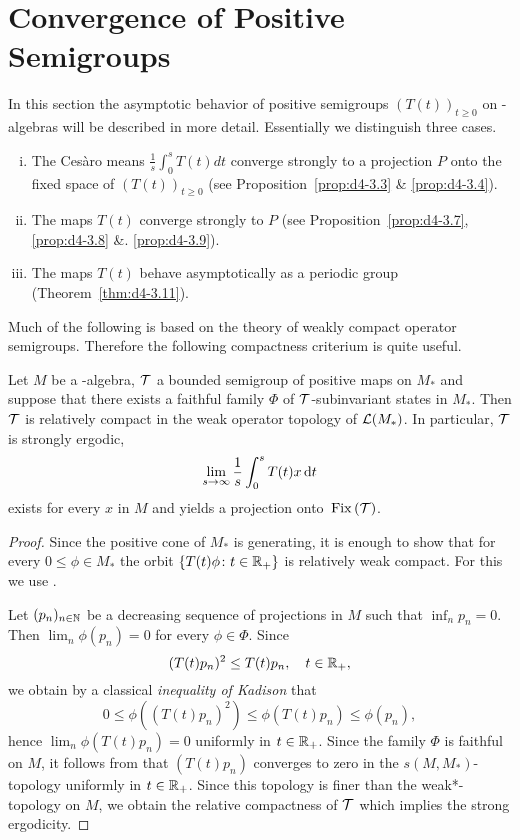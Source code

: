 \section{Convergence of Positive Semigroups}\label{sec:d4-3}
In this section the asymptotic behavior of positive semigroups $(T(t))_{t \geq 0}$ on \WA-algebras will be described in more detail.
Essentially we distinguish three cases.
\begin{enumerate}[(i)]
\item
The Cesàro means $\frac{1}{s}\int_{0}^{s} T(t)dt$ converge strongly to a projection $P$ onto the fixed space of $(T(t))_{t \geq 0}$ (see Proposition~\ref{prop:d4-3.3} \& \ref{prop:d4-3.4}).

\item
The maps $T(t)$ converge strongly to $P$ (see Proposition~\ref{prop:d4-3.7}, \ref{prop:d4-3.8} \&. \ref{prop:d4-3.9}).

\item
The maps $T(t)$ behave asymptotically as a periodic group (Theorem~\ref{thm:d4-3.11}).
\end{enumerate}
Much of the following is based on the theory of weakly compact operator semigroups.
Therefore the following compactness criterium is quite useful.
\begin{proposition}\label{prop:d4-3.1}
Let $M$ be a \WA-algebra, $\mathcal{T}$ a bounded semigroup of positive maps on $M_{*}$ and suppose that there exists a faithful family $\Phi$ of\/ $\mathcal{T}$-subinvariant states in $M_{*}$.
Then $\mathcal{T}$ is relatively compact in the weak operator topology of $ \mathcal{L}(M_{*}) $.
In particular, $\mathcal{T}$ is strongly ergodic, \ie 
%
\[
	\lim_{s \to \infty} \frac{1}{s}\int_{0}^{s} T(t)x \mathop{}\!\mathrm{d}{t}
\]
%
exists for every $x$ in $M$ and yields a projection onto $\mathop{}\mathrm{Fix}\left(\mathcal{T}\right)$.
\end{proposition}
%
\begin{proof}
Since the positive cone of $M_{*}$ is generating, it is enough to show that for every $0 \leq \phi \in M_{*}$ the orbit $\{T(t)\phi \colon t \in \mathbb{R}_{+}\}$ is relatively weak compact.
For this we use \citet[Theorem III.5.4.(iii)]{takesaki:1979}.

Let $(p_{n})_{n \in \mathbb{N}}$ be a decreasing sequence of projections in $M$ such that $\inf_{n} p_{n} = 0$.
Then $\lim_{n}\phi(p_{n}) = 0$ for every $\phi \in \Phi$.
Since
\[
	(T(t)p_{n})^2 \leq T(t)p_{n}, \quad t \in \mathbb{R}_{+},
\]
we obtain by a classical \emph{inequality of Kadison} that
\[
0 \leq \phi((T(t)p_{n})^2) \leq \phi(T(t)p_{n}) \leq \phi(p_{n}),
\]
hence $\lim_{n}\phi(T(t)p_{n}) = 0$ uniformly in $t \in \mathbb{R}_{+}$.
Since the family $\Phi$ is faithful on $M$, it follows from \citet[Proposition III.5.3]{takesaki:1979} that $(T(t)p_{n})$ converges to zero in the $s(M,M_{*})$-topology uniformly in $t \in \mathbb{R}_{+}$.
Since this topology is finer than the weak*-topology on $M$, we obtain the relative compactness of\/ $\mathcal{T}$ which implies the strong ergodicity.
\end{proof}
